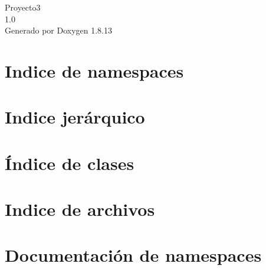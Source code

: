 \documentclass[twoside]{book}
\newcommand{\+}{\discretionary{\mbox{\scriptsize$\hookleftarrow$}}{}{}}
\newcommand{\clearemptydoublepage}{%
  \newpage{\pagestyle{empty}\cleardoublepage}%
}
\begin{document}
\hypersetup{pageanchor=false,
             bookmarksnumbered=true,
             pdfencoding=unicode
            }
\begin{titlepage}
\vspace*{7cm}
\begin{center}%
{\Large Proyecto3 \\[1ex]\large 1.\+0 }\\
\vspace*{1cm}
{\large Generado por Doxygen 1.8.13}\\
\end{center}
\end{titlepage}
\clearemptydoublepage
{}
\tableofcontents
\clearemptydoublepage
{}
\hypersetup{pageanchor=true}

\chapter{Indice de namespaces}

\chapter{Indice jerárquico}

\chapter{Índice de clases}

\chapter{Indice de archivos}

\chapter{Documentación de namespaces}






\end{document}
